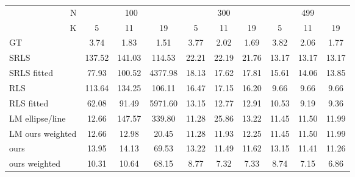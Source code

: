\begin{tabular}{l|ccc|ccc|ccc|}
\toprule
\multicolumn{1}{r|}{N} & \multicolumn{3}{|c|}{100} & \multicolumn{3}{|c|}{300} & \multicolumn{3}{|c|}{499} \\
\multicolumn{1}{r|}{K} &      5  &      11 &       19 &     5  &     11 &     19 &     5  &     11 &     19 \\
\midrule
GT               &    3.74 &    1.83 &     1.51 &   3.77 &   2.02 &   1.69 &   3.82 &   2.06 &   1.77 \\
\midrule SRLS            &  137.52 &  141.03 &   114.53 &  22.21 &  22.19 &  21.76 &  13.17 &  13.17 &  13.17 \\
SRLS fitted      &   77.93 &  100.52 &  4377.98 &  18.13 &  17.62 &  17.81 &  15.61 &  14.06 &  13.85 \\
RLS              &  113.64 &  134.25 &   106.11 &  16.47 &  1\cellcolor{\firstcolor}7.15 &  16.20 &   \cellcolor{\secondcolor}9.66 &   \cellcolor{\secondcolor}9.66 &   \cellcolor{\secondcolor}9.66 \\
RLS fitted       &   62.08 &   91.49 &  5971.60 &  13.15 &  12.77 &  12.91 &  10.53 &   \cellcolor{\secondcolor}9.19 &   \cellcolor{\secondcolor}9.36 \\
LM ellipse/line  &   \cellcolor{\secondcolor}12.66 &  147.57 &   339.80 &  \cellcolor{\secondcolor}11.28 &  25.86 &  13.22 &  11.45 &  11.50 &  11.99 \\
LM ours weighted &   \cellcolor{\secondcolor}12.66 &   \cellcolor{\secondcolor}12.98 &    \cellcolor{\firstcolor}20.45 &  \cellcolor{\secondcolor}11.28 &  11.93 &  12.25 &  11.45 &  11.50 &  11.99 \\
ours             &   13.95 &   14.13 &    69.53 &  13.22 &  \cellcolor{\secondcolor}11.49 &  \cellcolor{\secondcolor}11.62 &  13.15 &  11.41 &  11.26 \\
ours weighted    &   \cellcolor{\firstcolor}10.31 &   \cellcolor{\firstcolor}10.64 &    \cellcolor{\secondcolor}68.15 &   \cellcolor{\firstcolor}8.77 &   \cellcolor{\firstcolor}7.32 &   \cellcolor{\firstcolor}7.33 &   \cellcolor{\firstcolor}8.74 &   \cellcolor{\firstcolor}7.15 &   \cellcolor{\firstcolor}6.86 \\
\bottomrule
\end{tabular}

